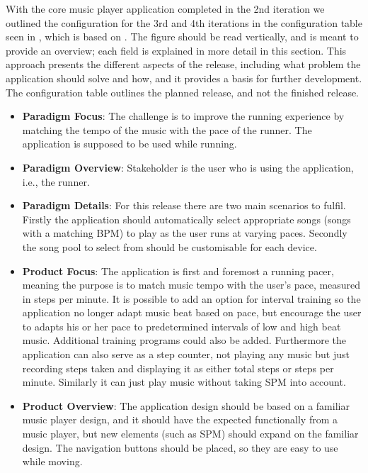 With the core music player application completed in the 2nd iteration we outlined the configuration for the 3rd and 4th iterations in the configuration table seen in , which is based on \citet[ch. 3]{essence:config}. The figure should be read vertically, and is meant to provide an overview; each field is explained in more detail in this section. This approach presents the different aspects of the release, including what problem the application should solve and how, and it provides a basis for further development. The configuration table outlines the planned release, and not the finished release.




\begin{itemize}
\item \textbf{Paradigm Focus}: The challenge is to improve the running experience by matching the tempo of the music with the pace of the runner. The application is supposed to be used while running.

\item \textbf{Paradigm Overview}: Stakeholder is the user who is using the application, i.e., the runner.

\item \textbf{Paradigm Details}: For this release there are two main scenarios to fulfil. Firstly the application should automatically select appropriate songs (songs with a matching BPM) to play as the user runs at varying paces. Secondly the song pool to select from should be customisable for each device.

\item \textbf{Product Focus}: The application is first and foremost a running pacer, meaning the purpose is to match music tempo with the user's pace, measured in steps per minute. It is possible to add an option for interval training so the application no longer adapt music beat based on pace, but encourage the user to adapts his or her pace to predetermined intervals of low and high beat music. Additional training programs could also be added. Furthermore the application can also serve as a step counter, not playing any music but just recording steps taken and displaying it as either total steps or steps per minute. Similarly it can just play music without taking SPM into account.

\item \textbf{Product Overview}: The application design should be based on a familiar music player design, and it should have the expected functionally from a music player, but new elements (such as SPM) should expand on the familiar design. The navigation buttons should be placed, so they are easy to use while moving.


\end{itemize}
